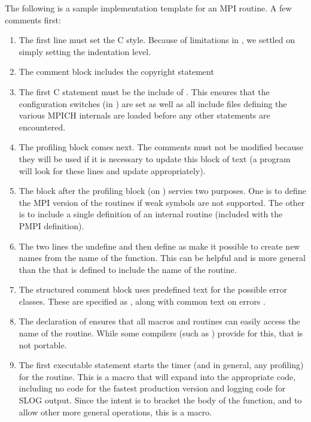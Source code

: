 \documentclass{article}
\begin{document}
The following is a sample implementation template for an MPI routine.
A few comments first:
\begin{enumerate}
\item The first line must set the C style.  Because of limitations in
, we settled on simply setting the indentation level.
\item The comment block includes the copyright statement
\item The first C statement must be the include of .  This
  ensures that the configuration switches (in ) are set as
  well as all include files defining the various MPICH internals are loaded
  before any other statements are encountered.
\item The profiling block comes next.  The comments must not be modified
  because they will be used if it is necessary to update this block of text (a
  program will look for these lines and update appropriately).
\item The block after the profiling block (on )
  servies two purposes.  One is to define the MPI version of the routines if
  weak symbols are not supported.  The other is to include a single definition
  of an internal routine (included with the PMPI definition).
\item The two lines the undefine  and then define
 as  make it possible to create new names
from the name of the function.  This can be helpful and is more
general than the  that is defined to include
the name of the routine.
\item The structured comment block uses predefined text for the possible error
  classes.  These are specified as , along with common text on
  errors .
\item The declaration of  ensures that all macros and
routines can easily access the name of the routine.  While some
compilers (such as ) provide  for this,
that is not portable.
\item 
The first executable statement starts the timer (and in general,
any profiling) for the routine.  This
  is a macro that will expand into the appropriate code, including no code for
  the fastest production version and logging code for SLOG output.
  Since the intent is to bracket the body of the function, and to
  allow other more general operations, this is a macro.

\end{enumerate}
\end{document}
